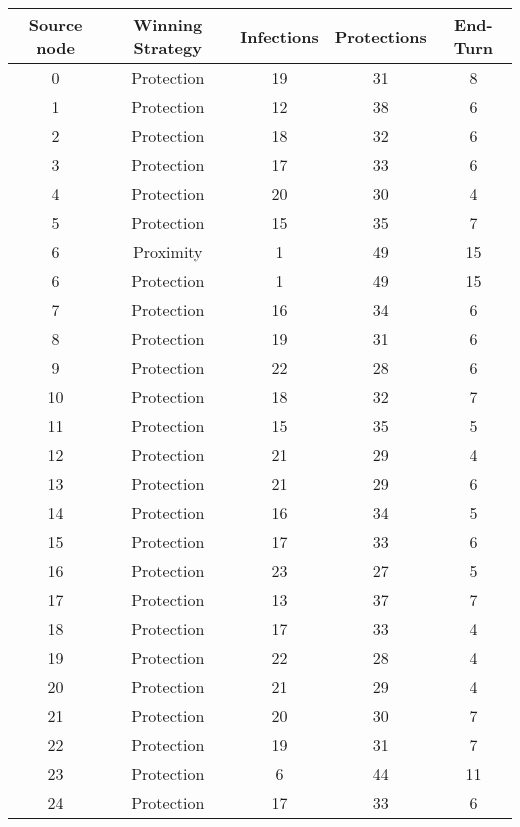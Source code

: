 \documentclass[results.tex]{subfiles}
\begin{document}
\begin{center}
  \begin{tabular}{| c || c | c | c | c |}
    \hline
    {\bfseries Source node} & {\bfseries Winning Strategy} & {\bfseries Infections} & {\bfseries Protections} & {\bfseries End-Turn} \\  %
    \hline\hline
    0 & Protection & 19 & 31 & 8 \\ 
    \hline
    1 & Protection & 12 & 38 & 6 \\ 
    \hline
    2 & Protection & 18 & 32 & 6 \\ 
    \hline
    3 & Protection & 17 & 33 & 6 \\ 
    \hline
    4 & Protection & 20 & 30 & 4 \\ 
    \hline
    5 & Protection & 15 & 35 & 7 \\ 
    \hline
    6 & Proximity & 1 & 49 & 15 \\ 
    \hline
    6 & Protection & 1 & 49 & 15 \\ 
    \hline
    7 & Protection & 16 & 34 & 6 \\ 
    \hline
    8 & Protection & 19 & 31 & 6 \\ 
    \hline
    9 & Protection & 22 & 28 & 6 \\ 
    \hline
    10 & Protection & 18 & 32 & 7 \\ 
    \hline
    11 & Protection & 15 & 35 & 5 \\ 
    \hline
    12 & Protection & 21 & 29 & 4 \\ 
    \hline
    13 & Protection & 21 & 29 & 6 \\ 
    \hline
    14 & Protection & 16 & 34 & 5 \\ 
    \hline
    15 & Protection & 17 & 33 & 6 \\ 
    \hline
    16 & Protection & 23 & 27 & 5 \\ 
    \hline
    17 & Protection & 13 & 37 & 7 \\ 
    \hline
    18 & Protection & 17 & 33 & 4 \\ 
    \hline
    19 & Protection & 22 & 28 & 4 \\ 
    \hline
    20 & Protection & 21 & 29 & 4 \\ 
    \hline
    21 & Protection & 20 & 30 & 7 \\ 
    \hline
    22 & Protection & 19 & 31 & 7 \\ 
    \hline
    23 & Protection & 6 & 44 & 11 \\ 
    \hline
    24 & Protection & 17 & 33 & 6 \\ 

\end{tabular}
\end{center}
\end{document}
